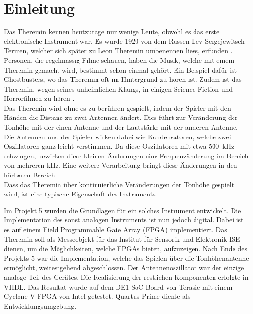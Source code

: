 \clearpage
\section{Einleitung}\label{sec:Einleitung}
Das Theremin kennen heutzutage nur wenige Leute, obwohl es das erste elektronische Instrument war. Es wurde 1920 von dem Russen Lev Sergejewitsch Termen, welcher sich später zu Leon Theremin umbenennen liess, erfunden \cite{Theremin_h}. Personen, die regelmässig Filme schauen, haben die Musik, welche mit einem Theremin gemacht wird, bestimmt schon einmal gehört. Ein Beispiel dafür ist Ghostbusters, wo das Theremin oft im Hintergrund zu hören ist. Zudem ist das Theremin, wegen seines unheimlichen Klangs, in einigen Science-Fiction und Horrorfilmen zu hören \cite{Goast_m}.\\
Das Theremin wird ohne es zu berühren gespielt, indem der Spieler mit den Händen die Distanz zu zwei Antennen ändert. Dies führt zur Veränderung der Tonhöhe mit der einen Antenne und der Lautstärke mit der anderen Antenne. Die Antennen und der Spieler wirken dabei wie Kondensatoren, welche zwei Oszillatoren ganz leicht verstimmen. Da diese Oszillatoren mit etwa \SI{500}{kHz} schwingen, bewirken diese kleinen Änderungen eine Frequenzänderung im Bereich von mehreren kHz. Eine weitere Verarbeitung bringt diese Änderungen in den hörbaren Bereich. \\
Dass das Theremin über kontinuierliche Veränderungen der Tonhöhe gespielt wird, ist eine typische Eigenschaft des Instruments.

Im Projekt 5 wurden die Grundlagen für ein solches Instrument entwickelt. Die Implementation des sonst analogen Instruments ist nun jedoch digital. Dabei ist es auf einem Field Programmable Gate Array (FPGA) implementiert. Das Theremin soll als Messeobjekt für das Institut für Sensorik und Elektronik ISE dienen, um die Möglichkeiten, welche FPGAs bieten, aufzuzeigen. Nach Ende des Projekts 5 war die Implementation, welche das Spielen über die Tonhöhenantenne ermöglicht, weitestgehend abgeschlossen. Der Antennenoszillator war der einzige analoge Teil des Gerätes. Die Realisierung der restlichen Komponenten erfolgte in VHDL. Das Resultat wurde auf dem DE1-SoC Board von Terasic mit einem Cyclone V FPGA von Intel getestet. Quartus Prime diente als Entwicklungsumgebung.

